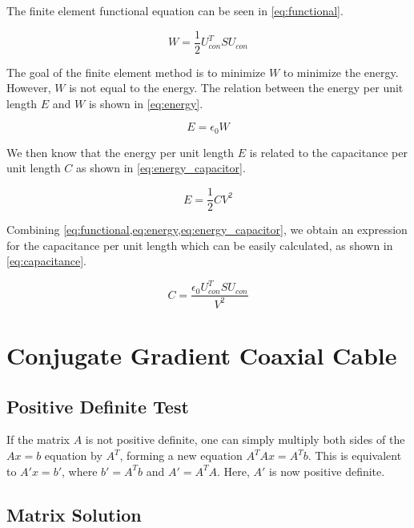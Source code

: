 \documentclass[a4paper,titlepage]{article}
\begin{document}
	The finite element functional equation can be seen in \cref{eq:functional}.
	
	\begin{equation} \label{eq:functional}
		W = \frac{1}{2} U_{con}^T S U_{con}
	\end{equation}
	
	The goal of the finite element method is to minimize $W$ to minimize the energy. However, $W$ is not equal to the energy. The relation between the energy per unit length $E$ and $W$ is shown in \cref{eq:energy}.
	
	\begin{equation} \label{eq:energy}
		E = \epsilon_0 W
	\end{equation}
	
	We then know that the energy per unit length $E$ is related to the capacitance per unit length $C$ as shown in \cref{eq:energy_capacitor}.
	
	\begin{equation} \label{eq:energy_capacitor}
		E = \frac{1}{2} C V^2
	\end{equation}
	
	Combining \cref{eq:functional,eq:energy,eq:energy_capacitor}, we obtain an expression for the capacitance per unit length which can be easily calculated, as shown in \autoref{eq:capacitance}.
	
	\begin{equation} \label{eq:capacitance}
		C = \frac{\epsilon_0 U_{con}^T S U_{con}}{V^2}
	\end{equation}
	
	\section{Conjugate Gradient Coaxial Cable}
	
	\subsection{Positive Definite Test}
	
	If the matrix $A$ is not positive definite, one can simply multiply both sides of the $Ax = b$ equation by $A^T$, forming a new equation $A^TAx = A^Tb$. This is equivalent to $A'x = b'$, where $b' = A^Tb$ and $A' = A^TA$. Here, $A'$ is now positive definite.
	
	\subsection{Matrix Solution}
	
\end{document}
